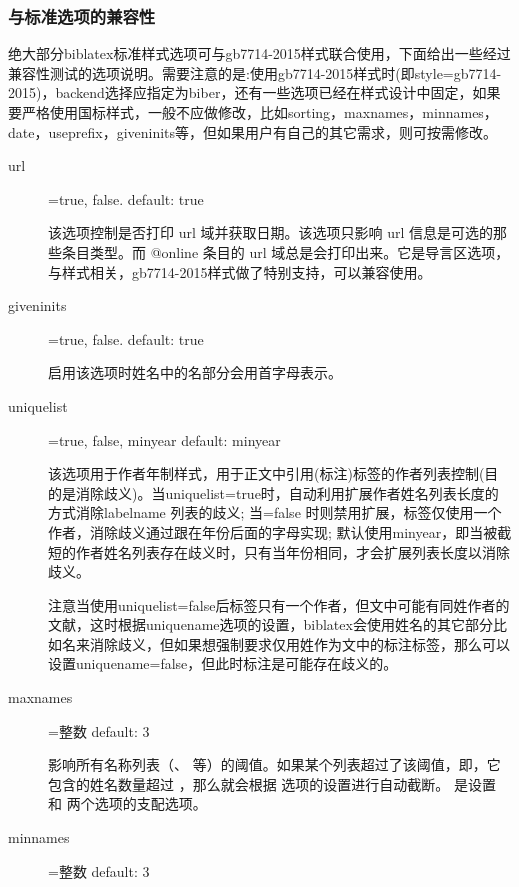 \subsubsection{与标准选项的兼容性}
绝大部分biblatex标准样式选项可与gb7714-2015样式联合使用，下面给出一些经过兼容性测试的选项说明。需要注意的是:使用gb7714-2015样式时(即style=gb7714-2015)，backend选择应指定为biber，还有一些选项已经在样式设计中固定，如果要严格使用国标样式，一般不应做修改，比如sorting，maxnames，minnames，date，useprefix，giveninits等，但如果用户有自己的其它需求，则可按需修改。

\begin{description}
  \item[url]=true, false. \hfill default: true

  该选项控制是否打印 url 域并获取日期。该选项只影响 url 信息是可选的那些条目类型。而 @online 条目的 url 域总是会打印出来。它是导言区选项，与样式相关，gb7714-2015样式做了特别支持，可以兼容使用。

  \item[giveninits]=true, false. \hfill default: true

  启用该选项时姓名中的名部分会用首字母表示。

  \item[uniquelist]=true, false, minyear \hfill default: minyear

  该选项用于作者年制样式，用于正文中引用(标注)标签的作者列表控制(目的是消除歧义)。当uniquelist=true时，自动利用扩展作者姓名列表长度的方式消除labelname 列表的歧义; 当=false 时则禁用扩展，标签仅使用一个作者，消除歧义通过跟在年份后面的字母实现; 默认使用minyear，即当被截短的作者姓名列表存在歧义时，只有当年份相同，才会扩展列表长度以消除歧义。

  注意当使用uniquelist=false后标签只有一个作者，但文中可能有同姓作者的文献，这时根据uniquename选项的设置，biblatex会使用姓名的其它部分比如名来消除歧义，但如果想强制要求仅用姓作为文中的标注标签，那么可以设置uniquename=false，但此时标注是可能存在歧义的。

  \item[maxnames]=整数 \hfill default: 3

  影响所有名称列表（、 等）的阈值。如果某个列表超过了该阈值，即，它包含的姓名数量超过 ，那么就会根据  选项的设置进行自动截断。 是设置  和  两个选项的支配选项。

  \item[minnames]=整数 \hfill default: 3


\end{description}
